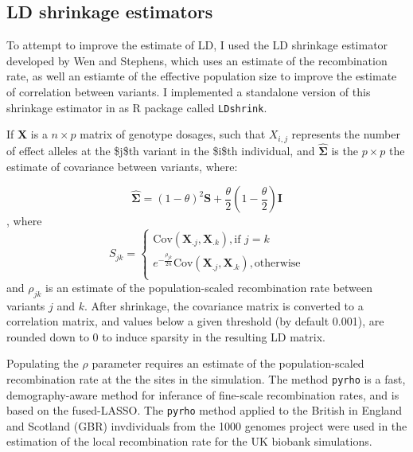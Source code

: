 \subsection{LD shrinkage estimators} 
To attempt to improve the estimate of LD, I used the LD shrinkage estimator developed by Wen and Stephens\cite{Wen_2010}, which uses an estimate of 
the recombination rate, as well an estiamte of the effective population size to improve the estimate of correlation between variants.
I implemented a standalone version of this shrinkage estimator in as R package called \texttt{LDshrink}. 

If \(\boldsymbol{X}\) is a \(n \times p\) matrix of genotype dosages, such that \(X_{i,j}\) represents the number of effect alleles at the \$j\$th variant in the \$i\$th individual, and \(\hat{\boldsymbol{\Sigma}}\) is the \(p \times p\)  the estimate of covariance between
variants, where:

\[\boldsymbol{\hat{\Sigma}} = (1-\theta)^2 \textbf{S}+\frac{\theta}{2} \left(1-\frac{\theta}{2}\right)\textbf{I}\],
where 
$$ S_{jk} = \begin{cases}
\text{Cov}(\boldsymbol{X}_{.j},\boldsymbol{X}_{.k}), \text{if } j=k \\
e^{-\frac{\rho_{jk}}{2n}}\text{Cov}(\boldsymbol{X}_{.j},\boldsymbol{X}_{.k}), \text{otherwise}\\
\end{cases} $$
and \(\rho_{jk}\) is an estimate of the population-scaled recombination rate between variants \(j\) and \(k\). After shrinkage, the covariance matrix is converted to a correlation matrix, and values below a given threshold (by default 0.001), are rounded down to 0 to induce sparsity in the resulting LD matrix.

Populating the \(\rho\) parameter requires an estimate of the population-scaled recombination rate at the the sites in the simulation.  The method \texttt{pyrho} is a fast, demography-aware method for inferance of fine-scale recombination rates, and is based on
the fused-LASSO\cite{Spence_2019}. The \texttt{pyrho} method applied to the British in England and Scotland (GBR) invdividuals from the 1000 genomes project\cite{1kg} were used in the estimation of the local recombination rate for the UK biobank simulations.



